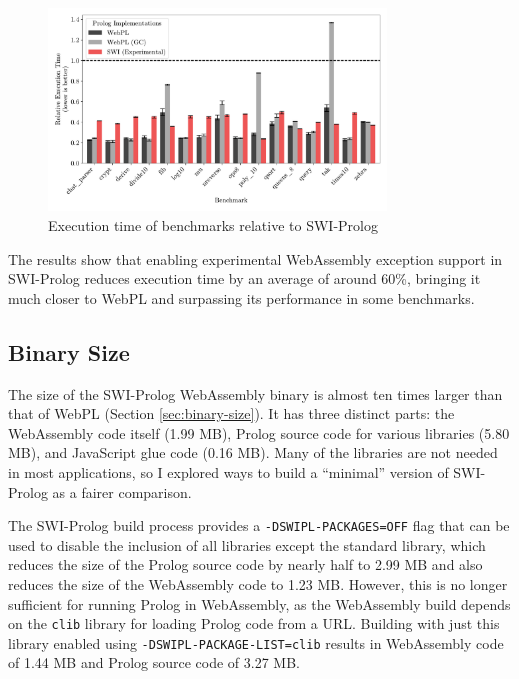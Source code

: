 \begin{figure}[H]
\centering
\includegraphics[width=0.8\textwidth]{relative_performance_exnref.pdf}
\caption{Execution time of benchmarks relative to SWI-Prolog}
\label{fig:swi-prolog-exception}
\end{figure}

The results show that enabling experimental WebAssembly exception support in SWI-Prolog reduces execution time by an average of around 60\%, bringing it much closer to WebPL and surpassing its performance in some benchmarks.

\subsection{Binary Size}

\label{sec:binary-size-opt}

The size of the SWI-Prolog WebAssembly binary is almost ten times larger than that of WebPL (Section \ref{sec:binary-size}). It has three distinct parts: the WebAssembly code itself (1.99 MB), Prolog source code for various libraries (5.80 MB), and JavaScript glue code (0.16 MB). Many of the libraries are not needed in most applications, so I explored ways to build a ``minimal'' version of SWI-Prolog as a fairer comparison.

The SWI-Prolog build process provides a \texttt{-DSWIPL-PACKAGES=OFF} flag that can be used to disable the inclusion of all libraries except the standard library, which reduces the size of the Prolog source code by nearly half to 2.99 MB and also reduces the size of the WebAssembly code to 1.23 MB. However, this is no longer sufficient for running Prolog in WebAssembly, as the WebAssembly build depends on the \texttt{clib} library for loading Prolog code from a URL. Building with just this library enabled using \texttt{-DSWIPL-PACKAGE-LIST=clib} results in WebAssembly code of 1.44 MB and Prolog source code of 3.27 MB.

